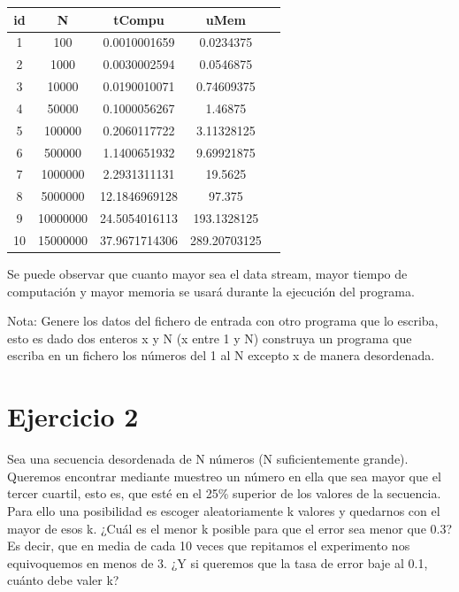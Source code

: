 \documentclass{uimppracticas}
\begin{document}
\begin{center}
	\begin{tabular}{ |c|c|c|c|c| } 
		\hline
		id & N & tCompu & uMem \\
		\hline
		1 &  100 &      0.0010001659 &    0.0234375 \\ 
		2 &  1000 &     0.0030002594 &    0.0546875 \\
		3 &  10000 &    0.0190010071 &    0.74609375 \\ 
		4 &  50000 &    0.1000056267 &    1.46875 \\ 
		5 &  100000 &   0.2060117722 &    3.11328125 \\ 
		6 &  500000 &   1.1400651932 &    9.69921875 \\ 
		7 &  1000000 &  2.2931311131 &   19.5625 \\ 
		8 &  5000000 &  12.1846969128 &  97.375 \\ 
		9 &  10000000 & 24.5054016113 & 193.1328125 \\ 
		10 & 15000000 & 37.9671714306 & 289.20703125 \\ 
		\hline
	\end{tabular}
\end{center}

Se puede observar que cuanto mayor sea el data stream, mayor tiempo de computación y mayor memoria se usará durante la ejecución del programa.

Nota: Genere los datos del fichero de entrada con otro programa que lo escriba, esto es dado dos enteros x y N (x entre 1 y N) construya un programa que escriba en un fichero los números del 1 al N excepto x de manera desordenada.



\section{Ejercicio 2}

Sea una secuencia desordenada de N números (N suficientemente grande). Queremos encontrar mediante muestreo un número en ella que sea mayor que el tercer cuartil, esto es, que esté en el 25\% superior de los valores de la secuencia. Para ello una posibilidad es escoger aleatoriamente k valores y quedarnos con el mayor de esos k. ¿Cuál es el menor k posible para que el error sea menor que 0.3? Es decir, que en media de cada 10 veces que repitamos el experimento nos equivoquemos en menos de 3. ¿Y si queremos que la tasa de error baje al 0.1, cuánto debe valer k? 
\end{document}

